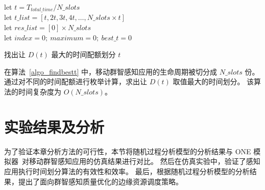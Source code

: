 \begin{algorithm}[h]
\setstretch{\algostretch}
let $t = T_{total\_time}/N\_slots$\\
let $t\_list = [t, 2t, 3t, 4t,\ldots,N\_slots \times t]$\\
let $res\_list = [0] \times N\_slots$\\
let $index = 0;\ maximum = 0;\ best\_t = 0$\\
\caption{找出让 $D(t)$ 最大的时间配额划分 $t$}
\label{algo_findbestt}
\end{algorithm}

在算法~\ref{algo_findbestt} 中，移动群智感知应用的生命周期被切分成 $N\_slots$ 份。
通过对不同的时间配额进行枚举计算，求出让 $D(t)$ 取值最大的时间划分。
该算法的时间复杂度为 $O(N\_slots)$。

\section{实验结果及分析}

为了验证本章分析方法的可行性，本节将随机过程分析模型的分析结果与 ONE 模拟器~\cite{DBLP:conf/simutools/OK09}对移动群智感知应用的仿真结果进行对比。
然后在仿真实验中，验证了感知应用执行时间划分算法的有效性和效率。
最后，根据随机过程分析模型的分析结果，提出了面向群智感知质量优化的边缘资源调度策略。

